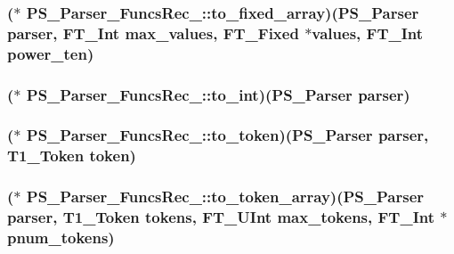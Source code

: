 \hypertarget{struct_p_s___parser___funcs_rec___a5b9316c7a5459857da99f6158afdf3d9}{
\subsubsection[{to\-\_\-fixed\-\_\-array}]{($\ast$ P\-S\-\_\-\-Parser\-\_\-\-Funcs\-Rec\-\_\-\-::to\-\_\-fixed\-\_\-array)({\bf P\-S\-\_\-\-Parser} parser, {\bf F\-T\-\_\-\-Int} max\-\_\-values, {\bf F\-T\-\_\-\-Fixed} $\ast${\bf values}, {\bf F\-T\-\_\-\-Int} power\-\_\-ten)}}\label{struct_p_s___parser___funcs_rec___a5b9316c7a5459857da99f6158afdf3d9}
\hypertarget{struct_p_s___parser___funcs_rec___a59a2017715d1a0db810c6e38ad3a4a67}{
\subsubsection[{to\-\_\-int}]{($\ast$ P\-S\-\_\-\-Parser\-\_\-\-Funcs\-Rec\-\_\-\-::to\-\_\-int)({\bf P\-S\-\_\-\-Parser} parser)}}\label{struct_p_s___parser___funcs_rec___a59a2017715d1a0db810c6e38ad3a4a67}
\hypertarget{struct_p_s___parser___funcs_rec___ad963b97fac4a1ae52f4a68e693f39907}{
\subsubsection[{to\-\_\-token}]{($\ast$ P\-S\-\_\-\-Parser\-\_\-\-Funcs\-Rec\-\_\-\-::to\-\_\-token)({\bf P\-S\-\_\-\-Parser} parser, {\bf T1\-\_\-\-Token} token)}}\label{struct_p_s___parser___funcs_rec___ad963b97fac4a1ae52f4a68e693f39907}
\hypertarget{struct_p_s___parser___funcs_rec___ac3cb6fd9c5eb16d8d853fa02e57602c2}{
\subsubsection[{to\-\_\-token\-\_\-array}]{($\ast$ P\-S\-\_\-\-Parser\-\_\-\-Funcs\-Rec\-\_\-\-::to\-\_\-token\-\_\-array)({\bf P\-S\-\_\-\-Parser} parser, {\bf T1\-\_\-\-Token} tokens, {\bf F\-T\-\_\-\-U\-Int} max\-\_\-tokens, {\bf F\-T\-\_\-\-Int} $\ast$pnum\-\_\-tokens)}}\label{struct_p_s___parser___funcs_rec___ac3cb6fd9c5eb16d8d853fa02e57602c2}



